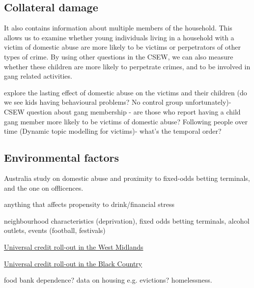 \documentclass[11pt, a4paper]{article}
\begin{document}
\subsection{Collateral damage}
It also contains information about  multiple members of the household. This allows us to examine whether young individuals living in a household with a victim of domestic abuse are more likely to be victims or perpetrators of other types of crime. By using other questions in the CSEW, we can also measure whether these children are more likely to perpetrate crimes, and to be involved in gang related activities.
 
 explore the lasting effect of domestic abuse on the victims and their children (do we see kids having behavioural problems? No control group unfortunately)- CSEW question about gang membership - are those who report having a child gang member more likely to be victims of domestic abuse? Following people over time (Dynamic topic modelling for victims)- what’s the temporal order? 

\subsection{Environmental factors}

Australia study on domestic abuse and proximity to fixed-odds betting terminals, and the one on offlicences.

anything that affects propensity to drink/financial stress

neighbourhood characteristics (deprivation), fixed odds betting terminals, alcohol outlets, events (football, festivals)

\href{https://www.birminghammail.co.uk/news/midlands-news/universal-credit-rolled-out-across-14142901}{Universal credit roll-out in the West Midlands}

\href{https://www.birminghammail.co.uk/black-country/universal-credit-claimants-black-country-15946831}{Universal credit roll-out in the Black Country}


food bank dependence? data on housing e.g. evictions? homelessness.



\newpage



\end{document}
